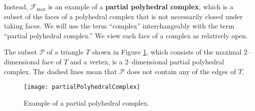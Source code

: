 Instead, \(\mathcal{F}_{\max}\) is an example of a \textbf{partial polyhedral complex}, which is a subset of the faces of a polyhedral complex that is not necessarily closed under taking faces. We will use the term ``complex'' interchangeably with the term ``partial polyhedral complex.'' We view each face of a complex as relatively open.

\begin{example}\label{nonStronglyPureExample}
The subset $\mathcal{P}$ of a triangle $T$ shown in Figure \ref{partialPolyhedralComplex}, which consists of the maximal $2$--dimensional face of $T$ and a vertex, is a $2$--dimensional partial polyhedral complex. The dashed lines mean that $\mathcal{P}$ does not contain any of the edges of $T$.

\vspace{12mm}

\begin{figure}[h!]
\begin{center}
\texttt{[image: partialPolyhedralComplex]}
\caption{Example of a partial polyhedral complex.}\label{partialPolyhedralComplex}
\end{center}
\end{figure}

\end{example}